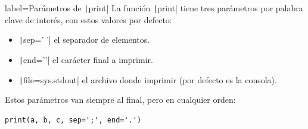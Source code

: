 \begin{contentbox}{label=Parámetros de \texttt|print|}
    La función \texttt|print| tiene tres parámetros por palabra clave de interés, con estos valores por defecto:
    \begin{itemize}
        \item \texttt|sep=' '| el separador de elementos.
        \item \texttt|end='\n'| el carácter final a imprimir.
        \item \texttt|file=sys.stdout| el archivo donde imprimir (por defecto es la consola).
    \end{itemize}

    Estos parámetros van siempre al final, pero en cualquier orden:

    \begin{verbatim}
print(a, b, c, sep=';', end='.')
    \end{verbatim}
\end{contentbox}
